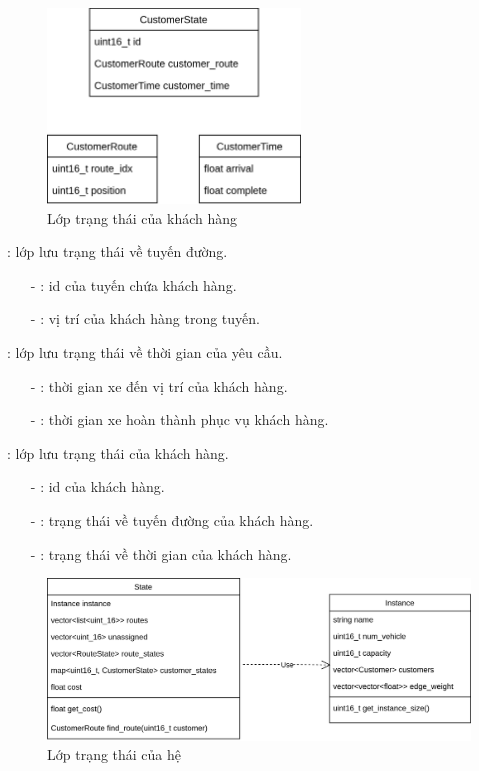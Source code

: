 \begin{figure}[H] %
	\centering %
	\includegraphics[width=0.6\textwidth]{figures/CustomerState.png}
	\caption{Lớp trạng thái của khách hàng}
	\label{fig:fg_03}
\end{figure}

: lớp lưu trạng thái về tuyến đường.
\begin{itemize}
	\item[-] : id của tuyến chứa khách hàng.
	\item[-] : vị trí của khách hàng trong tuyến.
\end{itemize}

: lớp lưu trạng thái về thời gian của yêu cầu.
\begin{itemize}
	\item[-] : thời gian xe đến vị trí của khách hàng.
	\item[-] : thời gian xe hoàn thành phục vụ khách hàng.
\end{itemize}

: lớp lưu trạng thái của khách hàng.
\begin{itemize}
	\item[-] : id của khách hàng.
	\item[-] : trạng thái về tuyến đường của khách hàng.
	\item[-] : trạng thái về thời gian của khách hàng.
\end{itemize}

\begin{figure}[H] %
	\centering %
	\includegraphics[width=1\textwidth]{figures/core-object.png}
	\caption{Lớp trạng thái của hệ}
	\label{fig:fg_03}
\end{figure}

